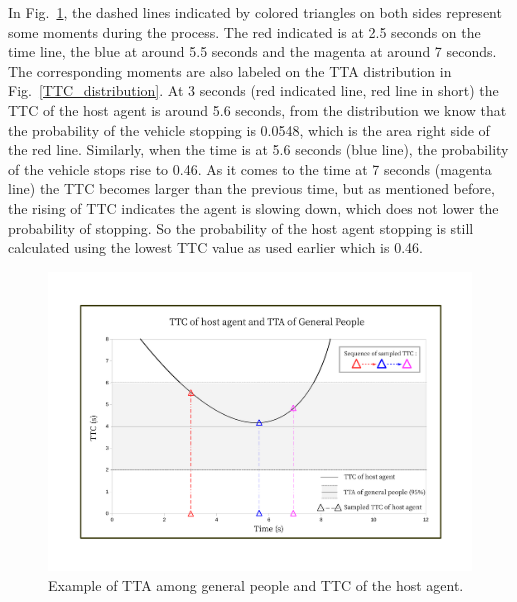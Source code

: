 \documentclass[twocolumn,10pt]{asme2e}
\begin{document}
In Fig.~\ref{TTC_TTA}, the dashed lines indicated by colored triangles on both sides represent some moments during the process. The red indicated is at 2.5 seconds on the time line, the blue at around 5.5 seconds and the magenta at around 7 seconds. The corresponding moments are also labeled on the TTA distribution in Fig.~\ref{TTC_distribution}. At 3 seconds (red indicated line, red line in short) the TTC of the host agent is around 5.6 seconds, from the distribution we know that the probability of the vehicle stopping is 0.0548, which is the area right side of the red line. Similarly, when the time is at 5.6 seconds (blue line), the probability of the vehicle stops rise to 0.46. As it comes to the time at 7 seconds (magenta line) the TTC becomes larger than the previous time, but as mentioned before, the rising of TTC indicates the agent is slowing down, which does not lower the probability of stopping. So the probability of the host agent stopping is still calculated using the lowest TTC value as used earlier which is 0.46.

\begin{figure}[htbp!]
\begin{center}
\includegraphics[scale=0.31]{TTC_probability.pdf}
\end{center}
\caption{Example of TTA among general people and TTC of the host agent.}
\label{TTC_TTA} 
\end{figure}
\end{document}

